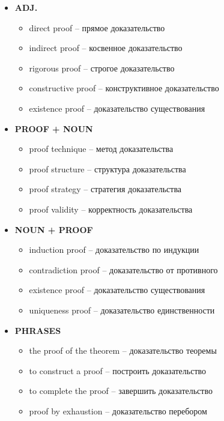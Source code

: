 \documentclass[a4paper, 10pt]{article}
\theoremstyle{definition}
\theoremstyle{plain}
\theoremstyle{remark}
\begin{document}
\begin{itemize}
    \item \textbf{ADJ.}
    \begin{itemize}
        \item direct proof – прямое доказательство
        \item indirect proof – косвенное доказательство
        \item rigorous proof – строгое доказательство
        \item constructive proof – конструктивное доказательство
        \item existence proof – доказательство существования
    \end{itemize}
    
    \item \textbf{PROOF + NOUN}
    \begin{itemize}
        \item proof technique – метод доказательства
        \item proof structure – структура доказательства
        \item proof strategy – стратегия доказательства
        \item proof validity – корректность доказательства
    \end{itemize}
    
    \item \textbf{NOUN + PROOF}
    \begin{itemize}
        \item induction proof – доказательство по индукции
        \item contradiction proof – доказательство от противного
        \item existence proof – доказательство существования
        \item uniqueness proof – доказательство единственности
    \end{itemize}
    
    \item \textbf{PHRASES}
    \begin{itemize}
        \item the proof of the theorem – доказательство теоремы
        \item to construct a proof – построить доказательство
        \item to complete the proof – завершить доказательство
        \item proof by exhaustion – доказательство перебором
    \end{itemize}
\end{itemize}
\end{document}
